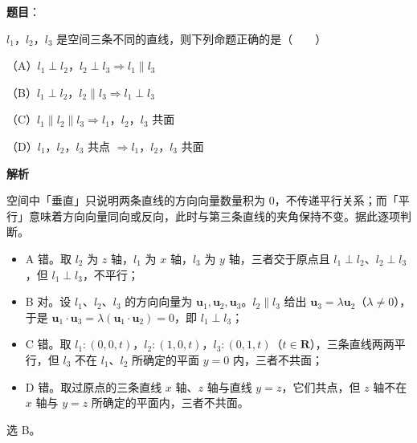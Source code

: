 \begin{answer}

\textbf{题目}：

$l_1$，$l_2$，$l_3$ 是空间三条不同的直线，则下列命题正确的是\mbox{（　　）}

（A）$l_1\perp l_2$，$l_2\perp l_3\Rightarrow l_1\parallel l_3$

（B）$l_1\perp l_2$，$l_2\parallel l_3\Rightarrow l_1\perp l_3$

（C）$l_1\parallel l_2\parallel l_3\Rightarrow l_1$，$l_2$，$l_3$ 共面

（D）$l_1$，$l_2$，$l_3$ 共点 $\Rightarrow l_1$，$l_2$，$l_3$ 共面

\textbf{解析}

空间中「垂直」只说明两条直线的方向向量数量积为 $0$，不传递平行关系；而「平行」意味着方向向量同向或反向，此时与第三条直线的夹角保持不变。据此逐项判断。

\begin{itemize}
\item A 错。取 $l_2$ 为 $z$ 轴，$l_1$ 为 $x$ 轴，$l_3$ 为 $y$ 轴，三者交于原点且 $l_1\perp l_2$、$l_2\perp l_3$，但 $l_1\perp l_3$，不平行；
\item B 对。设 $l_1$、$l_2$、$l_3$ 的方向向量为 $\boldsymbol{u}_1,\boldsymbol{u}_2,\boldsymbol{u}_3$。$l_2\parallel l_3$ 给出 $\boldsymbol{u}_3=\lambda\boldsymbol{u}_2$（$\lambda\neq0$），于是 $\boldsymbol{u}_1\cdot\boldsymbol{u}_3=\lambda(\boldsymbol{u}_1\cdot\boldsymbol{u}_2)=0$，即 $l_1\perp l_3$；
\item C 错。取 $l_1:(0,0,t)$，$l_2:(1,0,t)$，$l_3:(0,1,t)$（$t\in\mathbf R$），三条直线两两平行，但 $l_3$ 不在 $l_1$、$l_2$ 所确定的平面 $y=0$ 内，三者不共面；
\item D 错。取过原点的三条直线 $x$ 轴、$z$ 轴与直线 $y=z$，它们共点，但 $z$ 轴不在 $x$ 轴与 $y=z$ 所确定的平面内，三者不共面。
\end{itemize}

选 B。


\end{answer}
